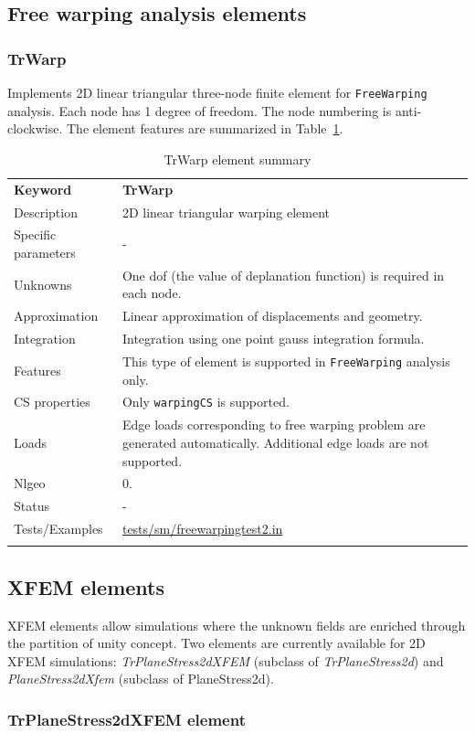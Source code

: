 \documentclass[a4paper]{article}
\newcommand{\param}[1]{\texttt{#1}} %
\newcommand{\templabel}{}%
\newcommand{\tempcaption}{}%
\newcounter{nelpar}
\newenvironment{elementsummary}[5]{%
  \gdef\tempcaption{#4}%
  \gdef\templabel{#5}%
  \setcounter{nelpar}{0}%
  \begin{center} %
    \begin{table}[!htb] %
      \begin{tabular}{|l|p{9cm}|}\hline %
        {\bf Keyword} & \bf{#1}\\ %
        {Description} & {#2}\\ %
        {Specific parameters} & {#3}\\ \hline %
}{
  \\ \hline %
      \end{tabular}%
      \caption{\tempcaption}%
      \label{\templabel}%
    \end{table}%
  \end{center}%
}
\newcommand{\elementDescription}[2]{{#1} & {#2}\\}
\begin{document}
\clearpage
\subsection{Free warping analysis elements}
\subsubsection{TrWarp}
Implements 2D linear triangular three-node finite element for \param{FreeWarping} analysis. Each node has 1 degree of freedom.
The node numbering is anti-clockwise. The element features are summarized in Table~\ref{TrWarpsummary}.


\begin{elementsummary}{TrWarp}{2D linear triangular warping element}{-}{TrWarp element summary}{TrWarpsummary}
\elementDescription{Unknowns}{One dof (the value of deplanation function) is required in each node.}
\elementDescription{Approximation}{Linear approximation of displacements and geometry.}
\elementDescription{Integration}{Integration using one point gauss integration formula.}
\elementDescription{Features}{This type of element is supported in \param{FreeWarping} analysis only.}
\elementDescription{CS properties}{Only \param{warpingCS} is supported.}
\elementDescription{Loads}{Edge loads corresponding to free warping problem are generated automatically. Additional edge loads are not supported.}
\elementDescription{Nlgeo}{0.}
\elementDescription{Status}{-}
\elementDescription{Tests/Examples}{\href{https://github.com/oofem/oofem/blob/devel/tests/sm/freewarpingtest2.in}{tests/sm/freewarpingtest2.in}}
\end{elementsummary}

\clearpage
\subsection{XFEM elements}
XFEM elements allow simulations where the unknown fields are enriched through
the partition of unity concept. Two elements are currently available for 2D XFEM
simulations: \textit{TrPlaneStress2dXFEM} (subclass of \textit{TrPlaneStress2d})
and \textit{PlaneStress2dXfem} (subclass of PlaneStress2d).

\subsubsection{TrPlaneStress2dXFEM element}
\end{document}
